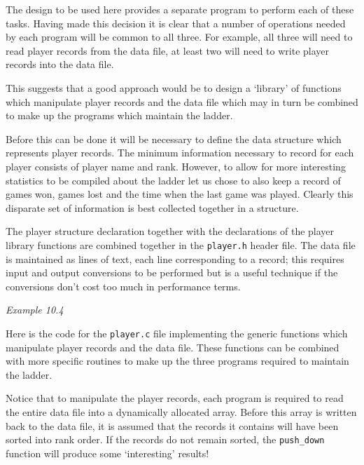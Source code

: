   The design to be used here provides a separate program to perform each of
   these tasks. Having made this decision it is clear that a number of
   operations needed by each program will be common to all three. For example,
   all three will need to read player records from the data file, at least two
   will need to write player records into the data file.


  This suggests that a good approach would be to design a `library' of
   functions which manipulate player records and the data file which may in
   turn be combined to make up the programs which maintain the ladder.


  Before this can be done it will be necessary to define the data structure
   which represents player records. The minimum information necessary to record
   for each player consists of player name and rank. However, to allow for more
   interesting statistics to be compiled about the ladder let us chose to also
   keep a record of games won, games lost and the time when the last game was
   played. Clearly this disparate set of information is best collected together
   in a structure.


  The player structure declaration together with the declarations of the
   player library functions are combined together in the \texttt{player.h}
   header file. The data file is maintained as lines of text, each line
   corresponding to a record; this requires input and output conversions to be
   performed but is a useful technique if the conversions don't cost too much
   in performance terms.


  \begin{center}\textit{Example 10.4}\end{center}


  Here is the code for the \texttt{player.c} file implementing the
   generic functions which manipulate player records and the data file. These
   functions can be combined with more specific routines to make up the three
   programs required to maintain the ladder.


  Notice that to manipulate the player records, each program is required to
   read the entire data file into a dynamically allocated array. Before this
   array is written back to the data file, it is assumed that the records it
   contains will have been sorted into rank order. If the records do not remain
   sorted, the \texttt{push\_down} function will produce some
   `interesting' results!


